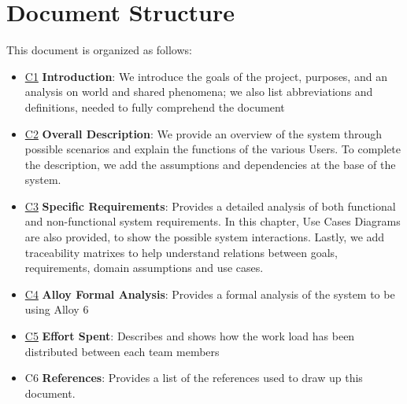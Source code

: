 \section{Document Structure}
\label{sec:structure}
This document is organized as follows:
\begin{itemize}
    \item \hyperref[ch:introduction]{\color{bluepoli}C1} \color{black} \textbf{Introduction}: We introduce the goals of the project, purposes, and an analysis on world and shared phenomena; we also list abbreviations and definitions, needed to fully comprehend the document
    \item \hyperref[ch:overall]{\color{bluepoli}C2} \color{black} \textbf{Overall Description}: We provide an overview of the system through possible scenarios and explain the functions of the various Users. To complete the description, we add the assumptions and dependencies at the base of the system.
    \item \hyperref[ch:requirements]{\color{bluepoli}C3} \color{black} \textbf{Specific Requirements}: Provides a detailed analysis of both functional and non-functional system requirements. In this chapter, Use Cases Diagrams are also provided, to show the possible system interactions. Lastly, we add traceability matrixes to help understand relations between goals, requirements, domain assumptions and use cases.
    \item \hyperref[ch:alloy]{\color{bluepoli}C4} \color{black} \textbf{Alloy Formal Analysis}: Provides a formal analysis of the system to be using Alloy 6
    \item \hyperref[ch:effort]{\color{bluepoli}C5} \color{black} \textbf{Effort Spent}: Describes and shows how the work load has been distributed between each team members
    \item \color{bluepoli} C6 \color{black}\textbf{References}: Provides a list of the references used to draw up this document.
\end{itemize}



